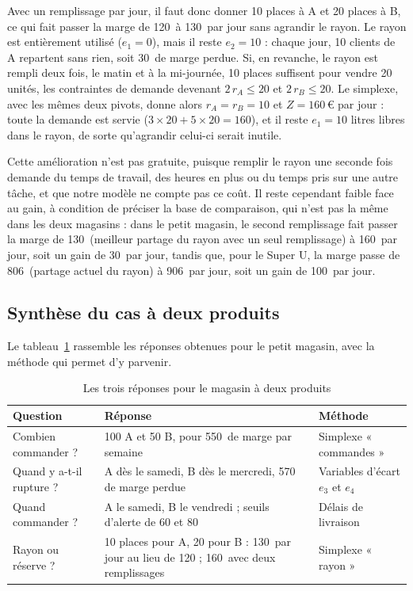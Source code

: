 \documentclass[11pt,a4paper]{article}
\newcommand{\eur}{\,\text{€}}
\begin{document}
Avec un remplissage par jour, il faut donc donner 10 places à A et 20 places à B, ce qui fait
passer la marge de 120\eur{} à 130\eur{} par jour sans agrandir le rayon. Le rayon est
entièrement utilisé ($e_1 = 0$), mais il reste $e_2 = 10$ : chaque jour, 10 clients de A
repartent sans rien, soit 30\eur{} de marge perdue. Si, en revanche, le rayon est rempli deux
fois, le matin et à la mi-journée, 10 places suffisent pour vendre 20 unités, les contraintes
de demande devenant $2\,r_A \le 20$ et $2\,r_B \le 20$. Le simplexe, avec les mêmes deux
pivots, donne alors $r_A = r_B = 10$ et $Z = 160\eur$ par jour : toute la demande est servie
($3 \times 20 + 5 \times 20 = 160$), et il reste $e_1 = 10$ litres libres dans le rayon, de
sorte qu'agrandir celui-ci serait inutile.

Cette amélioration n'est pas gratuite, puisque remplir le rayon une seconde fois demande du
temps de travail, des heures en plus ou du temps pris sur une autre tâche, et que notre modèle
ne compte pas ce coût. Il reste cependant faible face au gain, à condition de préciser la
base de comparaison, qui n'est pas la même dans les deux magasins : dans le petit magasin, le
second remplissage fait passer la marge de 130\eur{} (meilleur partage du rayon avec un seul
remplissage) à 160\eur{} par jour, soit un gain de 30\eur{} par jour, tandis que, pour le
Super U, la marge passe de 806\eur{} (partage actuel du rayon) à 906\eur{} par jour, soit un
gain de 100\eur{} par jour.

\subsection{Synthèse du cas à deux produits}
Le tableau~\ref{tab:synthese2} rassemble les réponses obtenues pour le petit magasin, avec la
méthode qui permet d'y parvenir.

\begin{table}[!htbp]
\centering\small
\caption{Les trois réponses pour le magasin à deux produits}\label{tab:synthese2}
\begin{tabular}{@{}p{3.4cm}p{7.2cm}p{3.2cm}@{}}
\toprule
Question & Réponse & Méthode \\
\midrule
Combien commander ? & 100 A et 50 B, pour 550\eur{} de marge par semaine & Simplexe « commandes » \\
Quand y a-t-il rupture ? & A dès le samedi, B dès le mercredi, 570\eur{} de marge perdue & Variables d'écart $e_3$ et $e_4$ \\
Quand commander ? & A le samedi, B le vendredi ; seuils d'alerte de 60 et 80 & Délais de livraison \\
Rayon ou réserve ? & 10 places pour A, 20 pour B : 130\eur{} par jour au lieu de 120 ;
  160\eur{} avec deux remplissages & Simplexe « rayon » \\
\bottomrule
\end{tabular}
\end{table}
\end{document}
